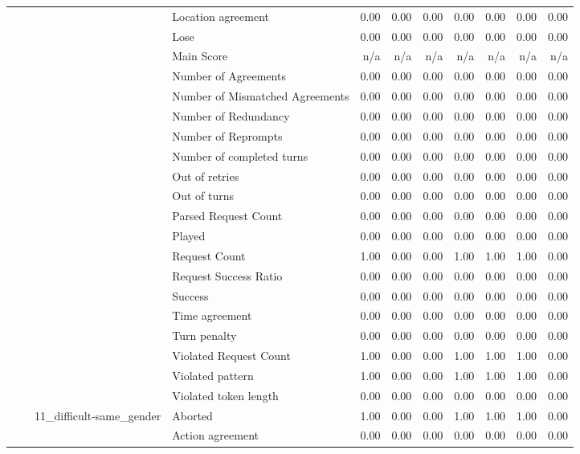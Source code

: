 \begin{tabular}{llllrrrrrrr}
 &  &  & Location agreement & 0.00 & 0.00 & 0.00 & 0.00 & 0.00 & 0.00 & 0.00 \\
 &  &  & Lose & 0.00 & 0.00 & 0.00 & 0.00 & 0.00 & 0.00 & 0.00 \\
 &  &  & Main Score & n/a & n/a & n/a & n/a & n/a & n/a & n/a \\
 &  &  & Number of Agreements & 0.00 & 0.00 & 0.00 & 0.00 & 0.00 & 0.00 & 0.00 \\
 &  &  & Number of Mismatched Agreements & 0.00 & 0.00 & 0.00 & 0.00 & 0.00 & 0.00 & 0.00 \\
 &  &  & Number of Redundancy & 0.00 & 0.00 & 0.00 & 0.00 & 0.00 & 0.00 & 0.00 \\
 &  &  & Number of Reprompts & 0.00 & 0.00 & 0.00 & 0.00 & 0.00 & 0.00 & 0.00 \\
 &  &  & Number of completed turns & 0.00 & 0.00 & 0.00 & 0.00 & 0.00 & 0.00 & 0.00 \\
 &  &  & Out of retries & 0.00 & 0.00 & 0.00 & 0.00 & 0.00 & 0.00 & 0.00 \\
 &  &  & Out of turns & 0.00 & 0.00 & 0.00 & 0.00 & 0.00 & 0.00 & 0.00 \\
 &  &  & Parsed Request Count & 0.00 & 0.00 & 0.00 & 0.00 & 0.00 & 0.00 & 0.00 \\
 &  &  & Played & 0.00 & 0.00 & 0.00 & 0.00 & 0.00 & 0.00 & 0.00 \\
 &  &  & Request Count & 1.00 & 0.00 & 0.00 & 1.00 & 1.00 & 1.00 & 0.00 \\
 &  &  & Request Success Ratio & 0.00 & 0.00 & 0.00 & 0.00 & 0.00 & 0.00 & 0.00 \\
 &  &  & Success & 0.00 & 0.00 & 0.00 & 0.00 & 0.00 & 0.00 & 0.00 \\
 &  &  & Time agreement & 0.00 & 0.00 & 0.00 & 0.00 & 0.00 & 0.00 & 0.00 \\
 &  &  & Turn penalty & 0.00 & 0.00 & 0.00 & 0.00 & 0.00 & 0.00 & 0.00 \\
 &  &  & Violated Request Count & 1.00 & 0.00 & 0.00 & 1.00 & 1.00 & 1.00 & 0.00 \\
 &  &  & Violated pattern & 1.00 & 0.00 & 0.00 & 1.00 & 1.00 & 1.00 & 0.00 \\
 &  &  & Violated token length & 0.00 & 0.00 & 0.00 & 0.00 & 0.00 & 0.00 & 0.00 \\
\cline{3-11}
 &  & \multirow[t]{27}{*}{11_difficult-same_gender} & Aborted & 1.00 & 0.00 & 0.00 & 1.00 & 1.00 & 1.00 & 0.00 \\
 &  &  & Action agreement & 0.00 & 0.00 & 0.00 & 0.00 & 0.00 & 0.00 & 0.00 \\

\end{tabular}
